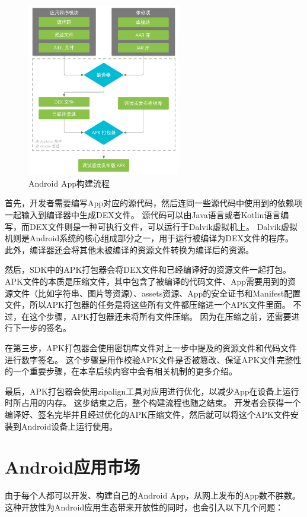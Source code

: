 \begin{figure}[htbp]
	\centering
	\includegraphics[width=0.6\textwidth]{./Figures/edwin-build-process-CHN.png}
	\caption{Android App构建流程}
	\label{fig:Android-Build-Process}
\end{figure}

首先，开发者需要编写App对应的源代码，然后连同一些源代码中使用到的依赖项一起输入到编译器中生成DEX文件。
源代码可以由Java语言或者Kotlin语言编写，而DEX文件则是一种可执行文件，可以运行于Dalvik虚拟机上。
Dalvik虚拟机则是Android系统的核心组成部分之一，用于运行被编译为DEX文件的程序。
此外，编译器还会将其他未被编译的资源文件转换为编译后的资源。

然后，SDK中的APK打包器会将DEX文件和已经编译好的资源文件一起打包。
APK文件的本质是压缩文件，其中包含了被编译的代码文件、App需要用到的资源文件（比如字符串、图片等资源）、assets资源、App的安全证书和Manifest配置文件，所以APK打包器的任务是将这些所有文件都压缩进一个APK文件里面。
不过，在这个步骤，APK打包器还未将所有文件压缩。
因为在压缩之前，还需要进行下一步的签名。

在第三步，APK打包器会使用密钥库文件对上一步中提及的资源文件和代码文件进行数字签名。
这个步骤是用作校验APK文件是否被篡改、保证APK文件完整性的一个重要步骤，在本章后续内容中会有相关机制的更多介绍。

最后，APK打包器会使用zipalign工具对应用进行优化，以减少App在设备上运行时所占用的内存。
这步结束之后，整个构建流程也随之结束。
开发者会获得一个编译好、签名完毕并且经过优化的APK压缩文件，然后就可以将这个APK文件安装到Android设备上运行使用。


\section{Android应用市场}
\label{sec:androidMkt}
由于每个人都可以开发、构建自己的Android App，从网上发布的App数不胜数。这种开放性为Android应用生态带来开放性的同时，也会引入以下几个问题：

